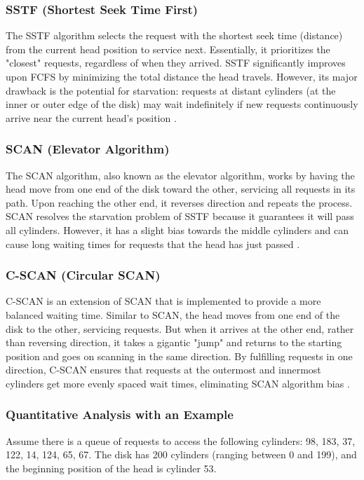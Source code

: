 \documentclass[12pt]{article}
\begin{document}
\subsubsection{SSTF (Shortest Seek Time First)}
The SSTF algorithm selects the request with the shortest seek time (distance) from the current head position to service next. Essentially, it prioritizes the "closest" requests, regardless of when they arrived. SSTF significantly improves upon FCFS by minimizing the total distance the head travels. However, its major drawback is the potential for starvation: requests at distant cylinders (at the inner or outer edge of the disk) may wait indefinitely if new requests continuously arrive near the current head's position \parencite{GeeksForGeeks2025IO} \parencite{KansalDiskScheduling}.

\subsubsection{SCAN (Elevator Algorithm)}
The SCAN algorithm, also known as the elevator algorithm, works by having the head move from one end of the disk toward the other, servicing all requests in its path. Upon reaching the other end, it reverses direction and repeats the process. SCAN resolves the starvation problem of SSTF because it guarantees it will pass all cylinders. However, it has a slight bias towards the middle cylinders and can cause long waiting times for requests that the head has just passed \parencite{GeeksForGeeks2025IO}.

\subsubsection{C-SCAN (Circular SCAN)}
C-SCAN is an extension of SCAN that is implemented to provide a more balanced waiting time. Similar to SCAN, the head moves from one end of the disk to the other, servicing requests. But when it arrives at the other end, rather than reversing direction, it takes a gigantic "jump" and returns to the starting position and goes on scanning in the same direction. By fulfilling requests in one direction, C-SCAN ensures that requests at the outermost and innermost cylinders get more evenly spaced wait times, eliminating SCAN algorithm bias \parencite{KansalDiskScheduling, GeeksForGeeks2025IO}.

\subsubsection{Quantitative Analysis with an Example}
Assume there is a queue of requests to access the following cylinders: 98, 183, 37, 122, 14, 124, 65, 67. The disk has 200 cylinders (ranging between 0 and 199), and the beginning position of the head is cylinder 53.
\end{document}
